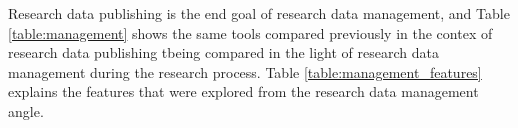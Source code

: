 \clearpage

Research data publishing is the end goal of research data management, and
Table \ref{table:management} shows the same tools compared previously in
the contex of research data publishing tbeing compared in the light
of research data management during the research process. Table
\ref{table:management_features} explains the features that were
explored from the research data management angle.

